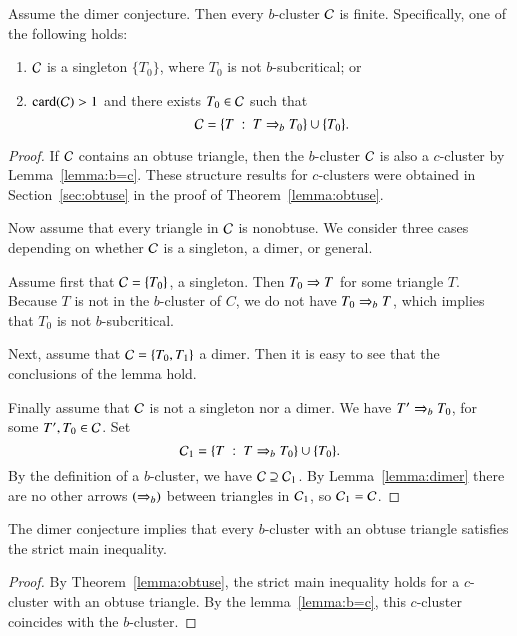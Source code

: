 \begin{lemma}\label{lemma:b-structure} 
  Assume the dimer conjecture.  Then every $b$-cluster $\mathcal C$ is finite.
  Specifically, one of the following holds:
\begin{enumerate}
\item $\mathcal C$ is a singleton $\{T_0\}$, where $T_0$ is not
  $b$-subcritical; or
\item ${\operatorname{card}}(\mathcal C)>1$ and there exists $T_0\in \mathcal C$ such that
\[
\mathcal C = \{T \ :\  T\Rightarrow_{b} T_0\} \cup \{T_0\}.
\]
\end{enumerate}
\end{lemma}

\begin{proof} If $\mathcal C$ contains an obtuse triangle, then the
  $b$-cluster $\mathcal C$ is also a $c$-cluster by Lemma~\ref{lemma:b=c}.
  These structure results for $c$-clusters were obtained in
  Section~\ref{sec:obtuse} in the proof of Theorem~\ref{lemma:obtuse}.

  Now assume that every triangle in $\mathcal C$ is nonobtuse.  We consider
  three cases depending on whether $\mathcal C$ is a singleton, a dimer, or
  general.

  Assume first that $\mathcal C = \{T_0\}$, a singleton.  Then $T_0\Rightarrow T$ for
  some triangle $T$.  Because $T$ is not in the $b$-cluster of $C$, we
  do not have $T_0\Rightarrow_{b} T$, which implies that $T_0$ is not
  $b$-subcritical.

  Next, assume that $\mathcal C = \{T_0,T_1\}$ a dimer.  Then it is easy to
  see that the conclusions of the lemma hold.

  Finally assume that $\mathcal C$ is not a singleton nor a dimer.  We have
  $T'\Rightarrow_{b} T_0$, for some $T',T_0\in \mathcal C$.  Set
\[
\mathcal C_1 = \{T \ :\  T\Rightarrow_{b} T_0\} \cup \{T_0\}.
\]
By the definition of a $b$-cluster, we have $\mathcal C\supseteq \mathcal C_1$.  By
Lemma~\ref{lemma:dimer} there are no other arrows $(\Rightarrow_{b})$ between
triangles in $\mathcal C_1$, so $\mathcal C_1 = \mathcal C$.
\end{proof}

\begin{lemma}\label{lemma:obtuse-main} 
  The dimer conjecture implies that every $b$-cluster with an obtuse
  triangle satisfies the strict main inequality.
\end{lemma}

\begin{proof} By Theorem~\ref{lemma:obtuse}, the strict main
  inequality holds for a $c$-cluster with an obtuse triangle.  By the
  lemma~\ref{lemma:b=c}, this $c$-cluster coincides with the
  $b$-cluster.
\end{proof}

